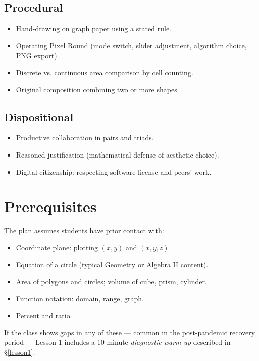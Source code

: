 \documentclass[12pt,letterpaper]{scrartcl}
\begin{document}
\subsection{Procedural}
\begin{itemize}[leftmargin=1.3em,itemsep=0.15em,topsep=0.3em]
  \item Hand-drawing on graph paper using a stated rule.
  \item Operating Pixel Round (mode switch, slider adjustment, algorithm choice, PNG export).
  \item Discrete vs. continuous area comparison by cell counting.
  \item Original composition combining two or more shapes.
\end{itemize}

\subsection{Dispositional}
\begin{itemize}[leftmargin=1.3em,itemsep=0.15em,topsep=0.3em]
  \item Productive collaboration in pairs and triads.
  \item Reasoned justification (mathematical defense of aesthetic choice).
  \item Digital citizenship: respecting software license and peers' work.
\end{itemize}

\section{Prerequisites}

The plan assumes students have prior contact with:

\begin{itemize}[leftmargin=1.3em,itemsep=0.15em,topsep=0.3em]
  \item Coordinate plane: plotting $(x, y)$ and $(x, y, z)$.
  \item Equation of a circle (typical Geometry or Algebra II content).
  \item Area of polygons and circles; volume of cube, prism, cylinder.
  \item Function notation: domain, range, graph.
  \item Percent and ratio.
\end{itemize}

If the class shows gaps in any of these --- common in the post-pandemic recovery period --- Lesson 1 includes a 10-minute \emph{diagnostic warm-up} described in §\ref{lesson1}.
\end{document}
